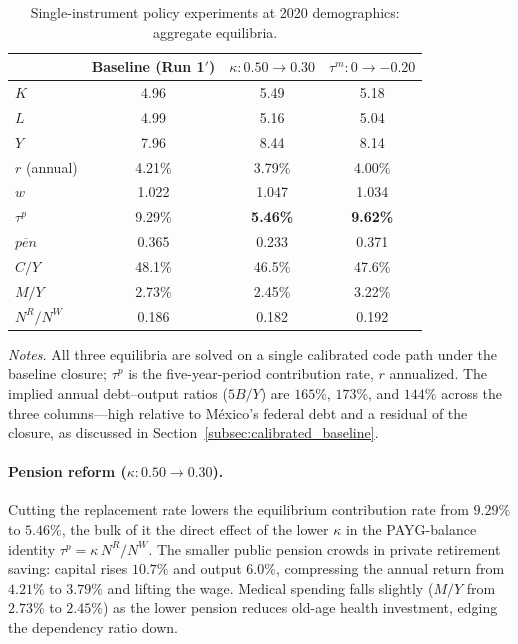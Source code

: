 \documentclass[12pt,a4paper]{article}
\begin{document}
\begin{table}[H]
\centering
\caption{Single-instrument policy experiments at 2020 demographics: aggregate equilibria.}
\label{tab:policy_aggregates}
\begin{tabular}{lccc}
\toprule
 & Baseline (Run 1$'$) & $\kappa: 0.50\to0.30$ & $\tau^m: 0\to-0.20$ \\
\midrule
$K$               & 4.96    & 5.49    & 5.18   \\
$L$               & 4.99    & 5.16    & 5.04   \\
$Y$               & 7.96    & 8.44    & 8.14   \\
$r$ (annual)      & 4.21\%  & 3.79\%  & 4.00\% \\
$w$               & 1.022   & 1.047   & 1.034  \\
$\tau^p$          & 9.29\%  & \textbf{5.46\%}  & \textbf{9.62\%} \\
$\overline{pen}$  & 0.365   & 0.233   & 0.371  \\
$C/Y$             & 48.1\%  & 46.5\%  & 47.6\% \\
$M/Y$             & 2.73\%  & 2.45\%  & 3.22\% \\
$N^R/N^W$         & 0.186   & 0.182   & 0.192  \\
\bottomrule
\end{tabular}

\vspace{0.5em}
\begin{minipage}{0.92\textwidth}
\footnotesize \textit{Notes.} All three equilibria are solved on a single calibrated code path under the baseline closure; $\tau^p$ is the five-year-period contribution rate, $r$ annualized. The implied annual debt--output ratios ($5B/Y$) are $165\%$, $173\%$, and $144\%$ across the three columns---high relative to M\'exico's federal debt and a residual of the closure, as discussed in Section~\ref{subsec:calibrated_baseline}.
\end{minipage}
\end{table}

\paragraph{Pension reform ($\kappa: 0.50\to0.30$).} Cutting the replacement rate lowers the equilibrium contribution rate from $9.29\%$ to $5.46\%$, the bulk of it the direct effect of the lower $\kappa$ in the PAYG-balance identity $\tau^p=\kappa\,N^R/N^W$. The smaller public pension crowds in private retirement saving: capital rises $10.7\%$ and output $6.0\%$, compressing the annual return from $4.21\%$ to $3.79\%$ and lifting the wage. Medical spending falls slightly ($M/Y$ from $2.73\%$ to $2.45\%$) as the lower pension reduces old-age health investment, edging the dependency ratio down.
\end{document}
